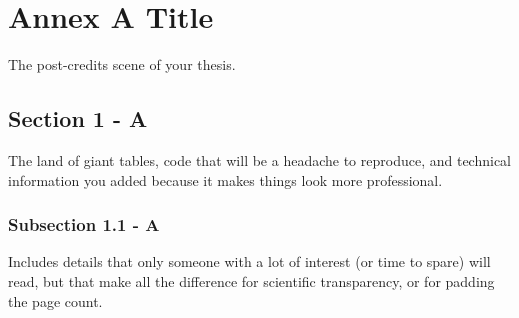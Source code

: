 %
%

\chapter{Annex A Title}\label{apen:annexA}

The post-credits scene of your thesis.

\section{Section 1 - A}

The land of giant tables, code that will be a headache to reproduce, and technical information you added because it makes things look more professional.

\subsection{Subsection 1.1 - A}

Includes details that only someone with a lot of interest (or time to spare) will read, but that make all the difference for scientific transparency, or for padding the page count.
